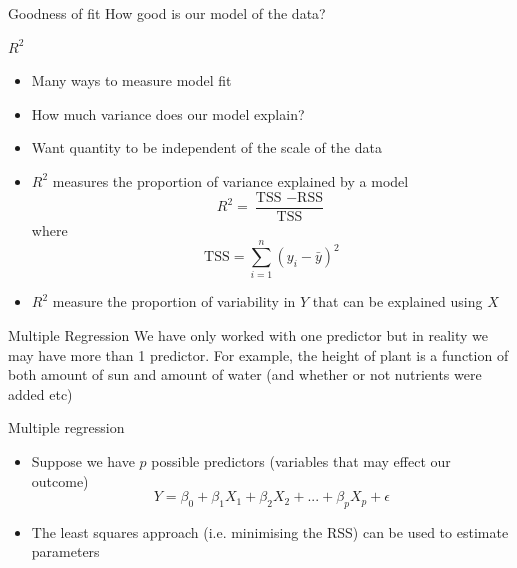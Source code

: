 \documentclass{bredelebeamer}
\begin{document}
\begin{frame}{Goodness of fit}
How good is our model of the data?
\begin{exampleblock}{$R^2$}
	\begin{itemize}
		\item Many ways to measure model fit 
		\item How much variance does our model explain?
		\item Want quantity to be independent of the scale of the data
		\item $R^2$ measures the proportion of variance explained by a model
		\begin{equation}
		R^2 = \frac{\text{TSS } - \text{RSS}}{\text{TSS}}
		\end{equation}
		where
		\begin{equation}
		\text{TSS} = \sum_{i = 1}^{n} (y_i - \bar{y})^2
		\end{equation}
		\item $R^2$ measure the proportion of variability in $Y$ that can be explained using $X$
		\end{itemize}
\end{exampleblock}
\end{frame}

\begin{frame}{Multiple Regression}
We have only worked with one predictor but in reality we may have more than 1 predictor. For example, the height of plant is a function of both amount of sun and amount of water (and whether or not nutrients were added etc)
\begin{exampleblock}{Multiple regression}
\begin{itemize}
\item Suppose we have $p$ possible predictors (variables that may effect our outcome)
\begin{equation}
Y = \beta_0 + \beta_1X_1 + \beta_2X_2 + ... + \beta_p X_p + \epsilon
\end{equation}
\item The least squares approach (i.e. minimising the RSS) can be used to estimate parameters
\end{itemize}
\end{exampleblock}
\end{frame}
\end{document}
